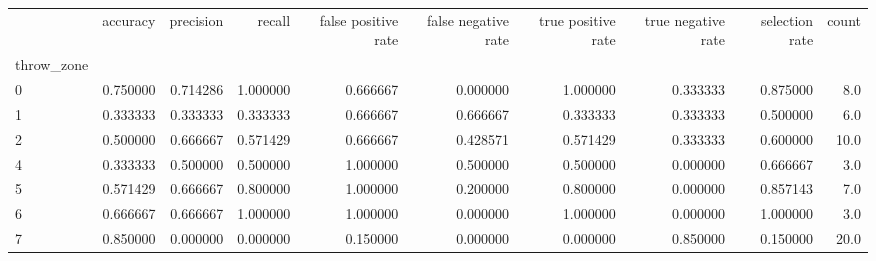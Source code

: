 \begin{tabular}{lrrrrrrrrr}
\toprule
{} &  accuracy &  precision &    recall &  false positive rate &  false negative rate &  true positive rate &  true negative rate &  selection rate &  count \\
throw\_zone &           &            &           &                      &                      &                     &                     &                 &        \\
\midrule
0          &  0.750000 &   0.714286 &  1.000000 &             0.666667 &             0.000000 &            1.000000 &            0.333333 &        0.875000 &    8.0 \\
1          &  0.333333 &   0.333333 &  0.333333 &             0.666667 &             0.666667 &            0.333333 &            0.333333 &        0.500000 &    6.0 \\
2          &  0.500000 &   0.666667 &  0.571429 &             0.666667 &             0.428571 &            0.571429 &            0.333333 &        0.600000 &   10.0 \\
4          &  0.333333 &   0.500000 &  0.500000 &             1.000000 &             0.500000 &            0.500000 &            0.000000 &        0.666667 &    3.0 \\
5          &  0.571429 &   0.666667 &  0.800000 &             1.000000 &             0.200000 &            0.800000 &            0.000000 &        0.857143 &    7.0 \\
6          &  0.666667 &   0.666667 &  1.000000 &             1.000000 &             0.000000 &            1.000000 &            0.000000 &        1.000000 &    3.0 \\
7          &  0.850000 &   0.000000 &  0.000000 &             0.150000 &             0.000000 &            0.000000 &            0.850000 &        0.150000 &   20.0 \\
\bottomrule
\end{tabular}
